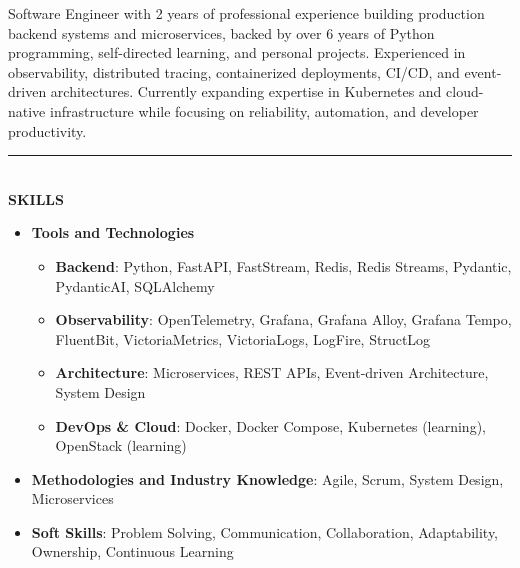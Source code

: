 \documentclass[10pt, dvipsnames, svgnames, x11names]{article}
\begin{document}
\setlength{\baselineskip}{11pt}
\vspace{1mm}

 \vspace{0.8mm}

\vspace{0.8mm}

\noindent Software Engineer with 2 years of professional experience building production backend systems and microservices, backed by over 6 years of Python programming, self-directed learning, and personal projects. Experienced in observability, distributed tracing, containerized deployments, CI/CD, and event-driven architectures. Currently expanding expertise in Kubernetes and cloud-native infrastructure while focusing on reliability, automation, and developer productivity.

\noindent\textcolor{DarkBlue}{\rule{\textwidth}{0.05mm}} \vspace{-1mm} \\
{\LARGE \textbf{SKILLS}}

\begin{itemize}[nosep]
\item \textbf{Tools and Technologies}
\begin{itemize}[nosep]
\item \textbf{Backend}: Python, FastAPI, FastStream, Redis, Redis Streams, Pydantic, PydanticAI, SQLAlchemy

\item \textbf{Observability}: OpenTelemetry, Grafana, Grafana Alloy, Grafana Tempo, FluentBit, VictoriaMetrics, VictoriaLogs,  LogFire, StructLog

\item \textbf{Architecture}: Microservices, REST APIs, Event-driven Architecture, System Design

\item \textbf{DevOps \& Cloud}: Docker, Docker Compose, Kubernetes (learning), OpenStack (learning)
\end{itemize}

\item \textbf{Methodologies and Industry Knowledge}: Agile, Scrum, System Design, Microservices
\item \textbf{Soft Skills}: Problem Solving, Communication, Collaboration, Adaptability, Ownership, Continuous Learning
\end{itemize}
\end{document}
